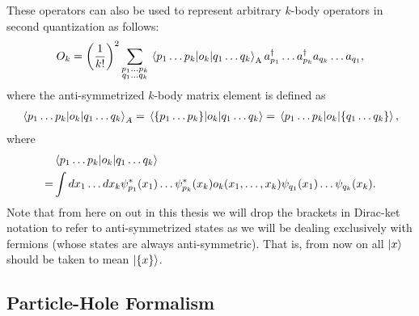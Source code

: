 \documentclass[10pt]{article}
\begin{document}
These operators can also be used to represent arbitrary $k$-body operators in second quantization as follows:
\begin{align}
O_k
=
\left(\frac{1}{k!}\right)^2\sum_{\substack{p_1\ldots p_k \\ q_1\ldots q_k}}\mel{p_1\ldots p_k}{o_k}{q_1\ldots q_k}_\text{A}a^\dagger_{p_1}\ldots a^\dagger_{p_k}a_{q_k}\ldots a_{q_1},
\end{align}
where the anti-symmetrized $k$-body matrix element is defined as
\begin{align}
\mel{p_1\ldots p_k}{o_k}{q_1\ldots q_k}_A
=
\mel{\{p_1\ldots p_k\}}{o_k}{q_1\ldots q_k}
=
\mel{p_1\ldots p_k}{o_k}{\{q_1\ldots q_k\}},
\end{align}
where
\begin{align}
&\mel{p_1\ldots p_k}{o_k}{q_1\ldots q_k}
\nonumber
\\
=&
\int dx_1\ldots dx_k \psi_{p_1}^*(x_1)\ldots\psi_{p_k}^*(x_k)o_k(x_1,\ldots,x_k)\psi_{q_1}(x_1)\ldots\psi_{q_k}(x_k).
\end{align}
Note that from here on out in this thesis we will drop the brackets in Dirac-ket notation to refer to anti-symmetrized states as we will be dealing exclusively with fermions (whose states are always anti-symmetric). That is, from now on all $\ket{x}$ should be taken to mean $\ket{\{x\}}$. 

\subsection{Particle-Hole Formalism}
\end{document}
